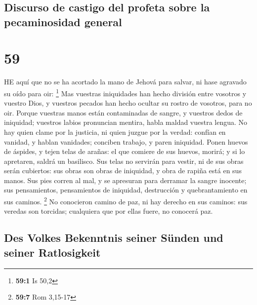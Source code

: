 \hypertarget{discurso-de-castigo-del-profeta-sobre-la-pecaminosidad-general}{%
\subsection{Discurso de castigo del profeta sobre la pecaminosidad
general}\label{discurso-de-castigo-del-profeta-sobre-la-pecaminosidad-general}}

\hypertarget{section-58}{%
\section{59}\label{section-58}}

 HE aquí que no se ha acortado la mano de Jehová para
salvar, ni hase agravado su oído para oir: \footnote{\textbf{59:1} Is
  50,2}  Mas vuestras iniquidades han hecho división entre
vosotros y vuestro Dios, y vuestros pecados han hecho ocultar su rostro
de vosotros, para no oir.  Porque vuestras manos están
contaminadas de sangre, y vuestros dedos de iniquidad; vuestros labios
pronuncian mentira, habla maldad vuestra lengua.  No hay
quien clame por la justicia, ni quien juzgue por la verdad: confían en
vanidad, y hablan vanidades; conciben trabajo, y paren iniquidad.
 Ponen huevos de áspides, y tejen telas de arañas: el que
comiere de sus huevos, morirá; y si lo apretaren, saldrá un basilisco.
 Sus telas no servirán para vestir, ni de sus obras serán
cubiertos: sus obras son obras de iniquidad, y obra de rapiña está en
sus manos.  Sus pies corren al mal, y se apresuran para
derramar la sangre inocente; sus pensamientos, pensamientos de
iniquidad, destrucción y quebrantamiento en sus caminos. \footnote{\textbf{59:7}
  Rom 3,15-17}  No conocieron camino de paz, ni hay derecho
en sus caminos: sus veredas son torcidas; cualquiera que por ellas
fuere, no conocerá paz.

\hypertarget{des-volkes-bekenntnis-seiner-suxfcnden-und-seiner-ratlosigkeit}{%
\subsection{Des Volkes Bekenntnis seiner Sünden und seiner
Ratlosigkeit}\label{des-volkes-bekenntnis-seiner-suxfcnden-und-seiner-ratlosigkeit}}

